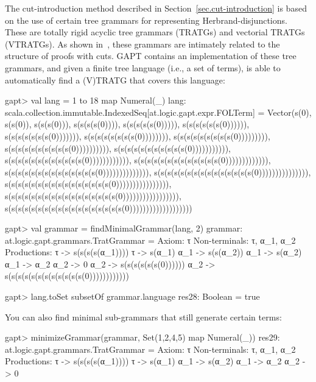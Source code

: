 \documentclass[a4paper,11pt]{article}
\begin{document}
The cut-introduction method described in Section~\ref{sec.cut-introduction} is
based on the use of certain tree grammars for representing Herbrand-disjunctions.
These are totally rigid acyclic tree grammars (TRATGs) and vectorial TRATGs (VTRATGs).
As shown in~\cite{Hetzl14Algorithmic}, these grammars are intimately related to
the structure of proofs with cuts.  GAPT contains an implementation of
these tree grammars, and given a finite tree language (i.e., a set of terms), is
able to automatically find a (V)TRATG that covers this language:

\begin{clilisting}
gapt> val lang = 1 to 18 map { Numeral(_) }
lang: scala.collection.immutable.IndexedSeq[at.logic.gapt.expr.FOLTerm] = Vector(s(0), s(s(0)), s(s(s(0))), s(s(s(s(0)))), s(s(s(s(s(0))))), s(s(s(s(s(s(0)))))), s(s(s(s(s(s(s(0))))))), s(s(s(s(s(s(s(s(0)))))))), s(s(s(s(s(s(s(s(s(0))))))))), s(s(s(s(s(s(s(s(s(s(0)))))))))), s(s(s(s(s(s(s(s(s(s(s(0))))))))))), s(s(s(s(s(s(s(s(s(s(s(s(0)))))))))))), s(s(s(s(s(s(s(s(s(s(s(s(s(0))))))))))))), s(s(s(s(s(s(s(s(s(s(s(s(s(s(0)))))))))))))), s(s(s(s(s(s(s(s(s(s(s(s(s(s(s(0))))))))))))))), s(s(s(s(s(s(s(s(s(s(s(s(s(s(s(s(0)))))))))))))))), s(s(s(s(s(s(s(s(s(s(s(s(s(s(s(s(s(0))))))))))))))))), s(s(s(s(s(s(s(s(s(s(s(s(s(s(s(s(s(s(0)))))))))))))))))))

gapt> val grammar = findMinimalGrammar(lang, 2)
grammar: at.logic.gapt.grammars.TratGrammar =
Axiom: τ
Non-terminals: τ, α_1, α_2
Productions:
  τ -> s(s(s(s(α_1))))
  τ -> s(α_1)
  α_1 -> s(s(α_2))
  α_1 -> s(α_2)
  α_1 -> α_2
  α_2 -> 0
  α_2 -> s(s(s(s(s(s(0))))))
  α_2 -> s(s(s(s(s(s(s(s(s(s(s(s(0))))))))))))

gapt> lang.toSet subsetOf grammar.language
res28: Boolean = true

\end{clilisting}

You can also find minimal sub-grammars that still generate certain terms:
\begin{clilisting}
gapt> minimizeGrammar(grammar, Set(1,2,4,5) map {Numeral(_)})
res29: at.logic.gapt.grammars.TratGrammar =
Axiom: τ
Non-terminals: τ, α_1, α_2
Productions:
  τ -> s(s(s(s(α_1))))
  τ -> s(α_1)
  α_1 -> s(α_2)
  α_1 -> α_2
  α_2 -> 0

\end{clilisting}
\end{document}
